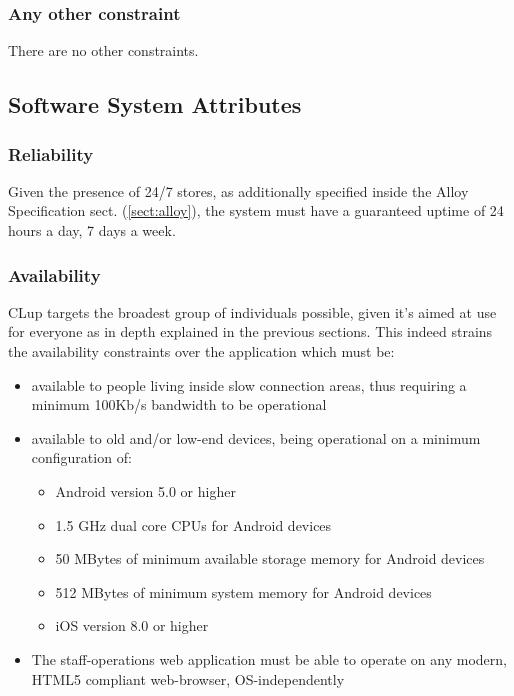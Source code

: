\subsubsection{Any other constraint}
There are no other constraints.

\subsection{Software System Attributes}

\subsubsection{Reliability}
Given the presence of 24/7 stores, as additionally specified inside the Alloy Specification sect. (\ref{sect:alloy}), the system must have a guaranteed uptime of 24 hours a day, 7 days a week.
\subsubsection{Availability}
CLup targets the broadest group of individuals possible, given it's aimed at use for everyone as in depth explained in the previous sections. This indeed strains the availability constraints over the application which must be:\newline
\begin{itemize}
    \item available to people living inside slow connection areas, thus requiring a minimum 100Kb/s bandwidth to be operational
    \item available to old and/or low-end devices, being operational on a minimum configuration of:
    \begin{itemize}
        \item Android version 5.0 or higher
        \item 1.5 GHz dual core CPUs for Android devices
        \item 50 MBytes of minimum available storage memory for Android devices
        \item 512 MBytes of minimum system memory for Android devices
        \item iOS version 8.0 or higher
    \end{itemize}
    \item The staff-operations web application must be able to operate on any modern, HTML5 compliant web-browser, OS-independently 
\end{itemize}
{\color{gray}
}


